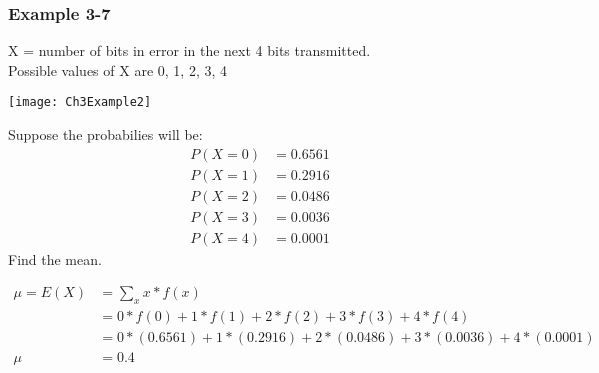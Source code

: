 \documentclass[../INDE315.tex]{subfiles}
\begin{document}
\subsubsection*{Example 3-7}
\begin{exmp}
    X = number of bits in error in the next 4 bits transmitted. \\
    Possible values of X are {0, 1, 2, 3, 4}
    \begin{center}
        \texttt{[image: Ch3Example2]}
    \end{center}
    Suppose the probabilies will be:
    \begin{equation*}
        \begin{aligned}
            P(X = 0) &= 0.6561 \\
            P(X = 1) &= 0.2916 \\
            P(X = 2) &= 0.0486 \\
            P(X = 3) &= 0.0036 \\
            P(X = 4) &= 0.0001 
        \end{aligned}
    \end{equation*} 
    Find the mean.   
\end{exmp}

\begin{equation*}
    \begin{aligned}
        \mu = E(X) &= \sum_{x} x * f(x) \\
                &= 0 * f(0) + 1 * f(1) + 2 * f(2) + 3 * f(3) + 4 * f(4) \\
                &= 0 * (0.6561) + 1 * (0.2916) + 2* (0.0486) + 3 * (0.0036) + 4 * (0.0001) \\
            \mu &= 0.4 
    \end{aligned}
\end{equation*} 
\end{document}
